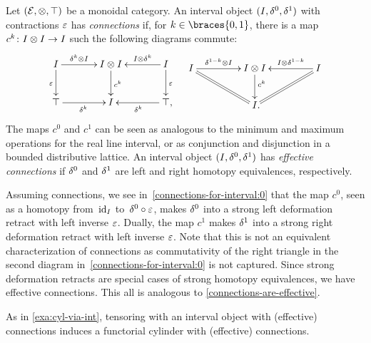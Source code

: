 \documentclass[reqno,10pt,a4paper,oneside,draft]{amsart}
\begin{document}
\begin{example} \label{exa:connections-for-interval}
Let $(\mathcal{E}, \otimes, \top)$ be a monoidal category.
An interval object $(I, \delta^0, \delta^1)$ with contractions $\varepsilon$ has \emph{connections} if, for $k \in \braces{0, 1}$, there is a map $c^k \colon I \otimes I \to I$ such the following diagrams commute:
\begin{align} \label{connections-for-interval:0}
\begin{aligned}
\xymatrix@C+1em{
  \interval
  \ar[r]^-{\kcyl \otimes \interval}
  \ar[d]_{\ccyl}
&
  \interval \otimes \interval
  \ar[d]^{c^k}
&
  \interval
  \ar[l]_-{\interval \otimes \kcyl}
  \ar[d]^{\ccyl}
\\
  \top
  \ar[r]_{\kcyl}
&
  \interval
&
  \top
  \ar[l]^{\kcyl}
\rlap{,}}
\end{aligned}
&&
\begin{aligned}
\xymatrix@C+2em{
  \interval
  \ar[r]^-{\kcylinv \otimes \interval}
  \ar@{=}[dr]
&
  \interval \otimes \interval
  \ar[d]^(0.4){c^k}
&
  \interval
  \ar[l]_-{\interval \otimes \kcylinv}
  \ar@{=}[dl]
\\&
  \interval
\rlap{.}}
\end{aligned}
\end{align}
The maps $c^0$ and $c^1$ can be seen as analogous to the minimum and maximum operations for the real line interval, or as conjunction and disjunction in a bounded distributive lattice.
An interval object $(I, \delta^0, \delta^1)$ has \emph{effective connections} if $\delta^0$ and $\delta^1$ are left and right homotopy equivalences, respectively.

Assuming connections, we see in~\eqref{connections-for-interval:0} that the map $c^0$, seen as a homotopy from~$\operatorname{id}_I$ to~$\delta^0 \mathbin{\circ} \varepsilon$, makes $\delta^0$ into a strong left deformation retract with left inverse $\varepsilon$.
Dually, the map $c^1$ makes $\delta^1$ into a strong right deformation retract with left inverse $\varepsilon$.
Note that this is not an equivalent characterization of connections as commutativity of the right triangle in the second diagram in~\eqref{connections-for-interval:0} is not captured.
Since strong deformation retracts are special cases of strong homotopy equivalences, we have effective connections.
This all is analogous to \cref{connections-are-effective}.

As in \cref{exa:cyl-via-int}, tensoring with an interval object with (effective) connections induces a functorial cylinder with (effective) connections.
\end{example}
\end{document}
